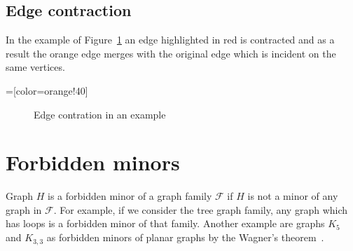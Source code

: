 \subsection{Edge contraction}

In the example of Figure~\ref{fig:edgecontr} an edge highlighted in red is contracted and as a result the orange edge merges with the original edge which is incident on the same vertices.

=[color=orange!40]

\begin{figure}[!ht]
  \centering

  \caption{Edge contration in an example}
  \label{fig:edgecontr}
\end{figure}

\section{Forbidden minors}

Graph $ H $ is a forbidden minor of a graph family $\mathcal{F} $ if $ H $ is not a minor of any graph in $ \mathcal{F} $. For example, if we consider the tree graph family, any graph which has loops is a forbidden minor of that family. Another example are graphs $ K_5 $ and $ K_{3, 3} $ as forbidden minors of planar graphs by the Wagner's theorem~\autocite[139]{chartrand2008chromatic}.

\sloppy
\printbibliography


